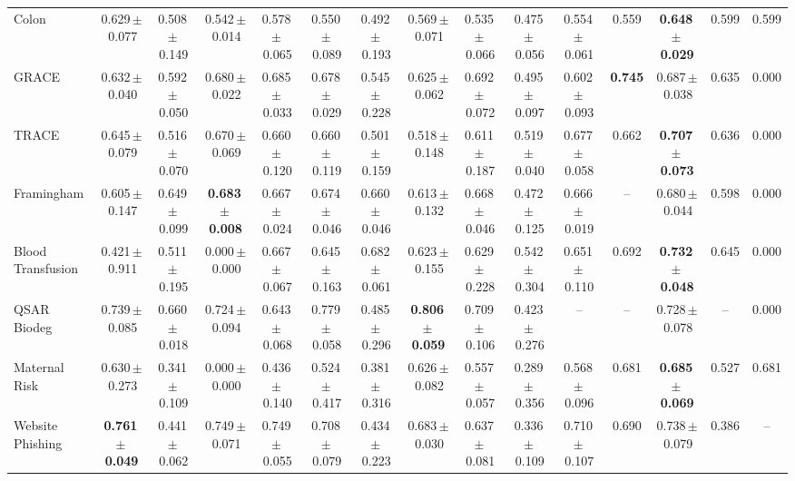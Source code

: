 \documentclass[8pt]{extarticle}
\begin{document}
\begin{longtable}{l*{14}{c}}
Colon & 0.629\,$\pm$\,0.077 & 0.508\,$\pm$\,0.149 & 0.542\,$\pm$\,0.014 & 0.578\,$\pm$\,0.065 & 0.550\,$\pm$\,0.089 & 0.492\,$\pm$\,0.193 & 0.569\,$\pm$\,0.071 & 0.535\,$\pm$\,0.066 & 0.475\,$\pm$\,0.056 & 0.554\,$\pm$\,0.061 & 0.559 & \textbf{0.648\,$\pm$\,0.029} & 0.599 & 0.599 \\
GRACE & 0.632\,$\pm$\,0.040 & 0.592\,$\pm$\,0.050 & 0.680\,$\pm$\,0.022 & 0.685\,$\pm$\,0.033 & 0.678\,$\pm$\,0.029 & 0.545\,$\pm$\,0.228 & 0.625\,$\pm$\,0.062 & 0.692\,$\pm$\,0.072 & 0.495\,$\pm$\,0.097 & 0.602\,$\pm$\,0.093 & \textbf{0.745} & 0.687\,$\pm$\,0.038 & 0.635 & 0.000 \\
TRACE & 0.645\,$\pm$\,0.079 & 0.516\,$\pm$\,0.070 & 0.670\,$\pm$\,0.069 & 0.660\,$\pm$\,0.120 & 0.660\,$\pm$\,0.119 & 0.501\,$\pm$\,0.159 & 0.518\,$\pm$\,0.148 & 0.611\,$\pm$\,0.187 & 0.519\,$\pm$\,0.040 & 0.677\,$\pm$\,0.058 & 0.662 & \textbf{0.707\,$\pm$\,0.073} & 0.636 & 0.000 \\
Framingham & 0.605\,$\pm$\,0.147 & 0.649\,$\pm$\,0.099 & \textbf{0.683\,$\pm$\,0.008} & 0.667\,$\pm$\,0.024 & 0.674\,$\pm$\,0.046 & 0.660\,$\pm$\,0.046 & 0.613\,$\pm$\,0.132 & 0.668\,$\pm$\,0.046 & 0.472\,$\pm$\,0.125 & 0.666\,$\pm$\,0.019 & -- & 0.680\,$\pm$\,0.044 & 0.598 & 0.000 \\
Blood Transfusion & 0.421\,$\pm$\,0.911 & 0.511\,$\pm$\,0.195 & 0.000\,$\pm$\,0.000 & 0.667\,$\pm$\,0.067 & 0.645\,$\pm$\,0.163 & 0.682\,$\pm$\,0.061 & 0.623\,$\pm$\,0.155 & 0.629\,$\pm$\,0.228 & 0.542\,$\pm$\,0.304 & 0.651\,$\pm$\,0.110 & 0.692 & \textbf{0.732\,$\pm$\,0.048} & 0.645 & 0.000 \\
QSAR Biodeg & 0.739\,$\pm$\,0.085 & 0.660\,$\pm$\,0.018 & 0.724\,$\pm$\,0.094 & 0.643\,$\pm$\,0.068 & 0.779\,$\pm$\,0.058 & 0.485\,$\pm$\,0.296 & \textbf{0.806\,$\pm$\,0.059} & 0.709\,$\pm$\,0.106 & 0.423\,$\pm$\,0.276 & -- & -- & 0.728\,$\pm$\,0.078 & -- & 0.000 \\
Maternal Risk & 0.630\,$\pm$\,0.273 & 0.341\,$\pm$\,0.109 & 0.000\,$\pm$\,0.000 & 0.436\,$\pm$\,0.140 & 0.524\,$\pm$\,0.417 & 0.381\,$\pm$\,0.316 & 0.626\,$\pm$\,0.082 & 0.557\,$\pm$\,0.057 & 0.289\,$\pm$\,0.356 & 0.568\,$\pm$\,0.096 & 0.681 & \textbf{0.685\,$\pm$\,0.069} & 0.527 & 0.681 \\
Website Phishing & \textbf{0.761\,$\pm$\,0.049} & 0.441\,$\pm$\,0.062 & 0.749\,$\pm$\,0.071 & 0.749\,$\pm$\,0.055 & 0.708\,$\pm$\,0.079 & 0.434\,$\pm$\,0.223 & 0.683\,$\pm$\,0.030 & 0.637\,$\pm$\,0.081 & 0.336\,$\pm$\,0.109 & 0.710\,$\pm$\,0.107 & 0.690 & 0.738\,$\pm$\,0.079 & 0.386 & -- \\
\end{longtable}
\end{document}
